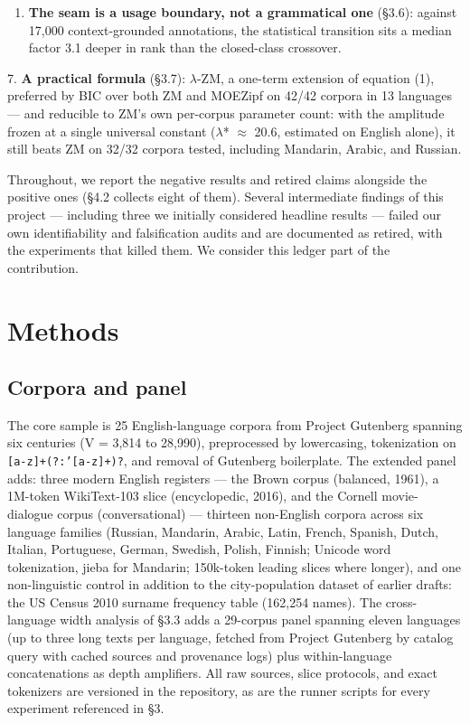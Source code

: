 \documentclass[11pt]{article}
\begin{document}
\begin{enumerate}
\item \textbf{The seam is a usage boundary, not a grammatical one} (\S3.6): against
17,000 context-grounded annotations, the statistical transition sits a median
factor 3.1 deeper in rank than the closed-class crossover.
\end{enumerate}
7. \textbf{A practical formula} (\S3.7): $\lambda$-ZM, a one-term extension of equation (1), preferred by BIC over both ZM and MOEZipf on 42/42 corpora in 13 languages --- and reducible to ZM's own per-corpus parameter count: with the amplitude frozen at a single universal constant ($\lambda$* $\approx$ 20.6, estimated on English alone), it still beats ZM on 32/32 corpora tested, including Mandarin, Arabic, and Russian.

Throughout, we report the negative results and retired claims alongside the positive ones (\S4.2 collects eight of them). Several intermediate findings of this project --- including three we initially considered headline results --- failed our own identifiability and falsification audits and are documented as retired, with the experiments that killed them. We consider this ledger part of the contribution.

\section{Methods}
\subsection{Corpora and panel}
The core sample is 25 English-language corpora from Project Gutenberg spanning six centuries (V = 3,814 to 28,990), preprocessed by lowercasing, tokenization on \texttt{[a-z]+(?:'[a-z]+)?}, and removal of Gutenberg boilerplate. The extended panel adds: three modern English registers --- the Brown corpus (balanced, 1961), a 1M-token WikiText-103 slice (encyclopedic, 2016), and the Cornell movie-dialogue corpus (conversational) --- thirteen non-English corpora across six language families (Russian, Mandarin, Arabic, Latin, French, Spanish, Dutch, Italian, Portuguese, German, Swedish, Polish, Finnish; Unicode word tokenization, jieba for Mandarin; 150k-token leading slices where longer), and one non-linguistic control in addition to the city-population dataset of earlier drafts: the US Census 2010 surname frequency table (162,254 names). The cross-language width analysis of \S3.3 adds a 29-corpus panel spanning eleven languages (up to three long texts per language, fetched from Project Gutenberg by catalog query with cached sources and provenance logs) plus within-language concatenations as depth amplifiers. All raw sources, slice protocols, and exact tokenizers are versioned in the repository, as are the runner scripts for every experiment referenced in \S3.
\end{document}
